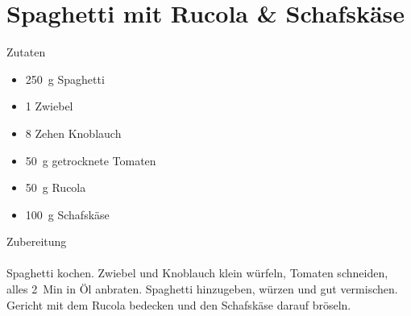 \section*{Spaghetti mit Rucola \& Schafskäse}
\ihead{}\ohead{}
\cfoot{}
{\Large Zutaten}
\begin{multicols}{2}
\begin{itemize}
    \item \SI{250}{g} Spaghetti
    \item \num{1} Zwiebel
    \item \num{8} Zehen Knoblauch
    \item \SI{50}{g} getrocknete Tomaten
    \item \SI{50}{g} Rucola
    \item \SI{100}{g} Schafskäse
\end{itemize}
\end{multicols}
\noindent
{\Large Zubereitung}\\
\\
Spaghetti kochen.
Zwiebel und Knoblauch klein würfeln, Tomaten schneiden, alles \SI{2}{Min} in Öl anbraten.
Spaghetti hinzugeben, würzen und gut vermischen.
Gericht mit dem Rucola bedecken und den Schafskäse darauf bröseln. 
